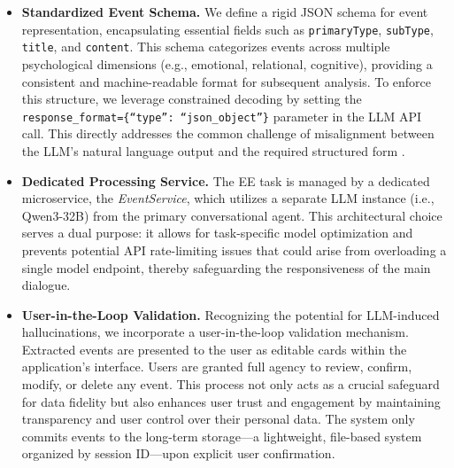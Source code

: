 \begin{itemize}
    \item \textbf{Standardized Event Schema.} We define a rigid JSON schema for event representation, encapsulating essential fields such as \texttt{primaryType}, \texttt{subType}, \texttt{title}, and \texttt{content}. This schema categorizes events across multiple psychological dimensions (e.g., emotional, relational, cognitive), providing a consistent and machine-readable format for subsequent analysis. To enforce this structure, we leverage constrained decoding by setting the \texttt{response\_format=\{``type'': ``json\_object''\}} parameter in the LLM API call. This directly addresses the common challenge of misalignment between the LLM's natural language output and the required structured form \cite{xu2023large}.

    \item \textbf{Dedicated Processing Service.} The EE task is managed by a dedicated microservice, the \textit{EventService}, which utilizes a separate LLM instance (i.e., Qwen3-32B) from the primary conversational agent. This architectural choice serves a dual purpose: it allows for task-specific model optimization and prevents potential API rate-limiting issues that could arise from overloading a single model endpoint, thereby safeguarding the responsiveness of the main dialogue.

    \item \textbf{User-in-the-Loop Validation.} Recognizing the potential for LLM-induced hallucinations, we incorporate a user-in-the-loop validation mechanism. Extracted events are presented to the user as editable cards within the application's interface. Users are granted full agency to review, confirm, modify, or delete any event. This process not only acts as a crucial safeguard for data fidelity but also enhances user trust and engagement by maintaining transparency and user control over their personal data. The system only commits events to the long-term storage---a lightweight, file-based system organized by session ID---upon explicit user confirmation.
\end{itemize} 